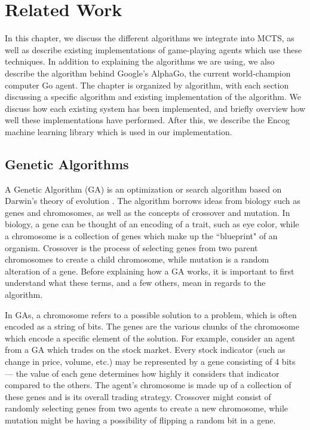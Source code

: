 %
%
\chapter{Related Work}\label{ch:relatedwork}
In this chapter, we discuss the different algorithms we integrate into MCTS, as well as describe existing implementations of game-playing agents which use these techniques.  In addition to explaining the algorithms we are using, we also describe the algorithm behind Google's AlphaGo, the current world-champion computer Go agent.  The chapter is organized by algorithm, with each section discussing a specific algorithm and existing implementation of the algorithm.  We discuss how each existing system has been implemented, and briefly overview how well these implementations have performed.  After this, we describe the Encog machine learning library which is used in our implementation.

\section{Genetic Algorithms}
A Genetic Algorithm (GA) is an optimization or search algorithm based on Darwin's theory of evolution \cite{fuzzymitchell99}.  The algorithm borrows ideas from biology such as genes and chromosomes, as well as the concepts of crossover and mutation.  In biology, a gene can be thought of an encoding of a trait, such as eye color, while a chromosome is a collection of genes which make up the ``blueprint" of an organism.  Crossover is the process of selecting genes from two parent chromosomes to create a child chromosome, while mutation is a random alteration of a gene.  Before explaining how a GA works, it is important to first understand what these terms, and a few others, mean in regards to the algorithm.

In GAs, a chromosome refers to a possible solution to a problem, which is often encoded as a string of bits.  The genes are the various chunks of the chromosome which encode a specific element of the solution.  For example, consider an agent from a GA which trades on the stock market.  Every stock indicator (such as change in price, volume, etc.) may be represented by a gene consisting of 4 bits --- the value of each gene determines how highly it considers that indicator compared to the others.  The agent's chromosome is made up of a collection of these genes and is its overall trading strategy.  Crossover might consist of randomly selecting genes from two agents to create a new chromosome, while mutation might be	having a possibility of flipping a random bit in a gene.


